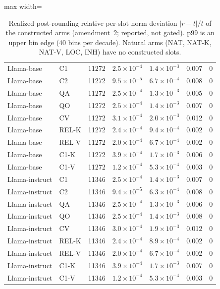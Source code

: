 \begin{table}[!htbp]
\begin{adjustbox}{max width=\linewidth}
\begin{tabular}{@{}l l r l l l l@{}}
\midrule
Llama-base & C1 & 11272 & $2.5\times10^{-4}$ & $1.4\times10^{-3}$ & 0.007 & 0 \\
Llama-base & C2 & 11272 & $9.5\times10^{-5}$ & $6.7\times10^{-4}$ & 0.008 & 0 \\
Llama-base & QA & 11272 & $2.5\times10^{-4}$ & $1.3\times10^{-3}$ & 0.005 & 0 \\
Llama-base & QO & 11272 & $2.5\times10^{-4}$ & $1.4\times10^{-3}$ & 0.007 & 0 \\
Llama-base & CV & 11272 & $3.1\times10^{-4}$ & $2.0\times10^{-3}$ & 0.012 & 0 \\
Llama-base & REL-K & 11272 & $2.4\times10^{-4}$ & $9.4\times10^{-4}$ & 0.002 & 0 \\
Llama-base & REL-V & 11272 & $2.0\times10^{-4}$ & $6.7\times10^{-4}$ & 0.002 & 0 \\
Llama-base & C1-K & 11272 & $3.9\times10^{-4}$ & $1.7\times10^{-3}$ & 0.006 & 0 \\
Llama-base & C1-V & 11272 & $1.2\times10^{-4}$ & $5.3\times10^{-4}$ & 0.003 & 0 \\
\midrule
Llama-instruct & C1 & 11346 & $2.5\times10^{-4}$ & $1.4\times10^{-3}$ & 0.007 & 0 \\
Llama-instruct & C2 & 11346 & $9.4\times10^{-5}$ & $6.3\times10^{-4}$ & 0.008 & 0 \\
Llama-instruct & QA & 11346 & $2.5\times10^{-4}$ & $1.3\times10^{-3}$ & 0.006 & 0 \\
Llama-instruct & QO & 11346 & $2.5\times10^{-4}$ & $1.4\times10^{-3}$ & 0.008 & 0 \\
Llama-instruct & CV & 11346 & $3.0\times10^{-4}$ & $1.9\times10^{-3}$ & 0.012 & 0 \\
Llama-instruct & REL-K & 11346 & $2.4\times10^{-4}$ & $8.9\times10^{-4}$ & 0.002 & 0 \\
Llama-instruct & REL-V & 11346 & $2.0\times10^{-4}$ & $6.7\times10^{-4}$ & 0.002 & 0 \\
Llama-instruct & C1-K & 11346 & $3.9\times10^{-4}$ & $1.7\times10^{-3}$ & 0.007 & 0 \\
Llama-instruct & C1-V & 11346 & $1.2\times10^{-4}$ & $5.3\times10^{-4}$ & 0.003 & 0 \\
\bottomrule
\end{tabular}\end{adjustbox}
\caption{Realized post-rounding relative per-slot norm deviation $|r-t|/t$ of the constructed arms (amendment~2; reported, not gated). p99 is an upper bin edge (40 bins per decade). Natural arms (NAT, NAT-K, NAT-V, LOC, INH) have no constructed slots.}
\label{tab:rdev}
\end{table}
